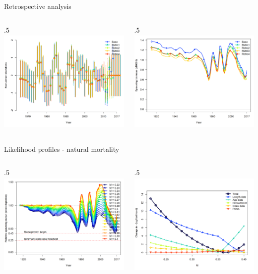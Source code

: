 \documentclass[ignorenonframetext,]{beamer}
\def\begincols{\begin{columns}}
\def\begincol{\begin{column}}
\def\endcol{\end{column}}
\def\endcols{\end{columns}}
\begin{document}
\begin{frame}{Retrospective analysis}

\begincols
 \begincol{.5\textwidth}
\includegraphics[height=5cm]{Figures/retro_recdev.png} \endcol
 \begincol{.5\textwidth}
\includegraphics[height=5cm]{Figures/retro_spawnb.png} \endcol
\endcols

\end{frame}

\begin{frame}{Likelihood profiles - natural mortality}

\begincols
 \begincol{.5\textwidth}
\includegraphics[height=5cm]{Figures/profile_m_depl.png} \endcol
 \begincol{.5\textwidth}
\includegraphics[height=5cm]{Figures/profile_m_like.png}\\
\endcol
\endcols

\end{frame}
\end{document}
